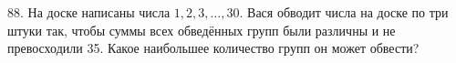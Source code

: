 88. На доске написаны числа $1, 2, 3,\ldots, 30.$ Вася обводит числа на доске по три штуки так, чтобы суммы всех обведённых групп были различны и не превосходили 35. Какое наибольшее количество групп он может обвести?\\
